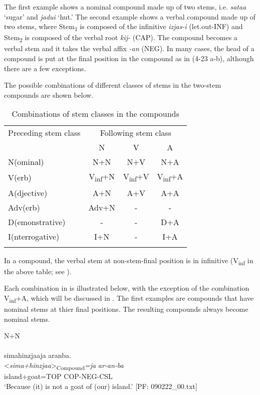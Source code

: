 The first example shows a nominal compound made up of two stems, i.e. \textit{sataa} ‘sugar’ and \textit{jadui} ‘hut.’ The second example shows a verbal compound made up of two stems, where Stem\textsubscript{1} is composed of the infinitive \textit{izjas-i} (let.out-INF) and Stem\textsubscript{2} is composed of the verbal root \textit{kij-} (CAP). The compound becomes a verbal stem and it takes the verbal affix \textit{-an} (NEG). In many cases, the head of a compound is put at the final position in the compound as in (4-23 a-b), although there are a few exceptions.

  The possible combinations of different classes of stems in the two-stem compounds are shown below.

\begin{table}
\caption{\label{tab:25}Combinations of stem classes in the compounds}
\begin{tabular}{lccc}
\lsptoprule
Preceding stem class  & \multicolumn{3}{c}{Following stem class}\\\cmidrule(lr){2-4}
& N & V & A\\\midrule
N(ominal)       & N+N  & N+V & N+A\\
V(erb)          & V\textsubscript{inf}+N &  V\textsubscript{inf}+V & V\textsubscript{inf}+A\\
A(djective)     & A+N & A+V & A+A\\
Adv(erb)        & Adv+N & {}-  & {}-\\
D(emonstrative) & {}- & {}- & D+A\\
I(nterrogative) & I+N & {}- & I+A\\
\lspbottomrule
\end{tabular}
\end{table}

In a compound, the verbal stem at non-stem-final position is in infinitive (V\textsubscript{inf} in the above table; see ).

Each combination in  is illustrated below, with the exception of the combination V\textsubscript{inf}+A, which will be discussed in . The first examples are compounds that have nominal stems at thier final positions. The resulting compounds always become nominal stems.

\ea \label{ex:4.24}
\ea N+N \label{ex:4.24a}\\\\
\glll  simahinzjaaja  aranba.\\
      <\textit{sima+hinzjaa}>\textsubscript{Compound}\textit{=ja}  \textit{ar-an-ba}\\
      island+goat=TOP  COP-NEG-CSL\\
      \glt       ‘Because (it) is not a goat of (our) island.’ [PF: 090222\_00.txt]

